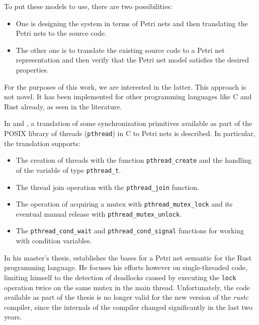 \documentclass[../Thesis.tex]{subfiles}
\begin{document}
To put these models to use, there are two possibilities:

\begin{itemize}
      \item One is designing the system in terms of Petri nets
            and then translating the Petri nets to the source code.
      \item The other one is to translate the existing source code to a Petri net representation
            and then verify that the Petri net model satisfies the desired properties.
\end{itemize}

For the purposes of this work, we are interested in the latter.
This approach is not novel.
It has been implemented for other programming languages like C and Rust already,
as seen in the literature.

In \cite{kavi2002modeling} and \cite{moshtaghi2001},
a translation of some synchronization primitives available as part of
the POSIX library of threads (\texttt{pthread}) in C to Petri nets is described.
In particular, the translation supports:

\begin{itemize}
      \item The creation of threads with the function \texttt{pthread\_create}
            and the handling of the variable of type \texttt{pthread\_t}.
      \item The thread join operation with the \texttt{pthread\_join} function.
      \item The operation of acquiring a mutex with \texttt{pthread\_mutex\_lock}
            and its eventual manual release with \texttt{pthread\_mutex\_unlock}.
      \item The \texttt{pthread\_cond\_wait} and \texttt{pthread\_cond\_signal} functions
            for working with condition variables.
\end{itemize}

In his master's thesis, \cite{meyer2020} establishes
the bases for a Petri net semantic for the Rust programming language.
He focuses his efforts however on single-threaded code,
limiting himself to the detection of deadlocks caused by
executing the \texttt{lock} operation twice on the same mutex in the main thread.
Unfortunately, the code available as part of the thesis is
no longer valid for the new version of the \emph{rustc} compiler,
since the internals of the compiler changed significantly in the last two years.
\end{document}
